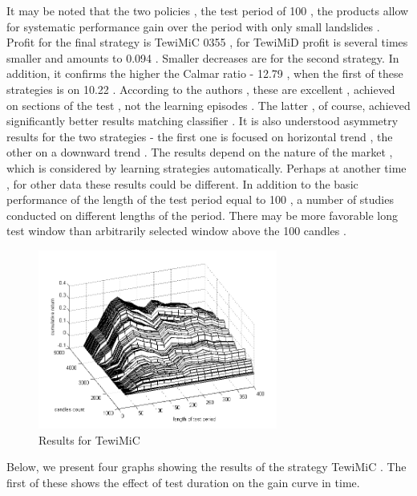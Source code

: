 \documentclass{tewiart}
\begin{document}
It may be noted that the two policies , the test period of 100 , the products allow for systematic performance gain over the period with
 only small landslides . Profit for the final strategy is TewiMiC 0355 , for TewiMiD profit is several times smaller and amounts to 0.094 . 
Smaller decreases are for the second strategy. In addition, it confirms the higher the Calmar ratio - 12.79 , 
when the first of these strategies is on 10.22 .
According to the authors , these are excellent , achieved on sections of the test , not the learning episodes .
 The latter , of course, achieved significantly better results matching classifier . It is also understood asymmetry results for the two strategies
 - the first one is focused on horizontal trend , the other on a downward trend . The results depend on the nature of the market , 
which is considered by learning strategies automatically. Perhaps at another time , for other data these results could be different.
In addition to the basic performance of the length of the test period equal to 100 , a number of studies conducted on different lengths
 of the period. There may be more favorable long test window than arbitrarily selected window above the 100 candles .\\

\begin{figure}[h!]
\begin{center}
\includegraphics[width=0.7\textwidth]{pictures/cumulativeReturnsC.png}
\caption{Results for TewiMiC}
\label{Cum3DMiC}
\end{center}
\end{figure}
\FloatBarrier

Below, we present four graphs showing the results of the strategy TewiMiC . The first of these shows the effect of test duration on the gain curve in time.
\end{document}
